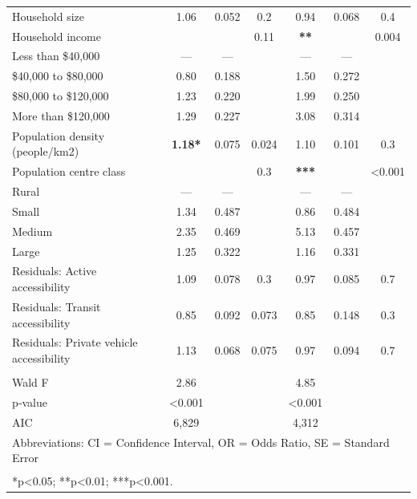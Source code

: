 \documentclass[preprint, 3p,
authoryear]{elsarticle} %
\begin{document}
\begin{table}
\begin{tabular}[t]{lcccccc}
\addlinespace
Household size & 1.06 & 0.052 & 0.2 & 0.94 & 0.068 & 0.4\\
Household income &  &  & 0.11 & \textbf{**} &  & 0.004\\
\hspace{1em}Less than \$40,000 & — & — &  & — & — & \\
\hspace{1em}\$40,000 to \$80,000 & 0.80 & 0.188 &  & 1.50 & 0.272 & \\
\hspace{1em}\$80,000 to \$120,000 & 1.23 & 0.220 &  & 1.99 & 0.250 & \\
\addlinespace
\hspace{1em}More than \$120,000 & 1.29 & 0.227 &  & 3.08 & 0.314 & \\
Population density (people/km2) & \textbf{1.18*} & 0.075 & 0.024 & 1.10 & 0.101 & 0.3\\
Population centre class &  &  & 0.3 & \textbf{***} &  & <0.001\\
\hspace{1em}Rural & — & — &  & — & — & \\
\hspace{1em}Small & 1.34 & 0.487 &  & 0.86 & 0.484 & \\
\addlinespace
\hspace{1em}Medium & 2.35 & 0.469 &  & 5.13 & 0.457 & \\
\hspace{1em}Large & 1.25 & 0.322 &  & 1.16 & 0.331 & \\
Residuals: Active accessibility & 1.09 & 0.078 & 0.3 & 0.97 & 0.085 & 0.7\\
Residuals: Transit accessibility & 0.85 & 0.092 & 0.073 & 0.85 & 0.148 & 0.3\\
Residuals: Private vehicle accessibility & 1.13 & 0.068 & 0.075 & 0.97 & 0.094 & 0.7\\
\midrule\\
\addlinespace
Wald F & 2.86 &  &  & 4.85 &  & \\
p‑value & <0.001 &  &  & <0.001 &  & \\
AIC & 6,829 &  &  & 4,312 &  & \\
\bottomrule
\multicolumn{7}{l}{\rule{0pt}{1em}Abbreviations: CI = Confidence Interval, OR = Odds Ratio, SE = Standard Error}\\
\multicolumn{7}{l}{\textsuperscript{} *p<0.05; **p<0.01; ***p<0.001.}\\
\end{tabular}
\end{table}
\end{document}
